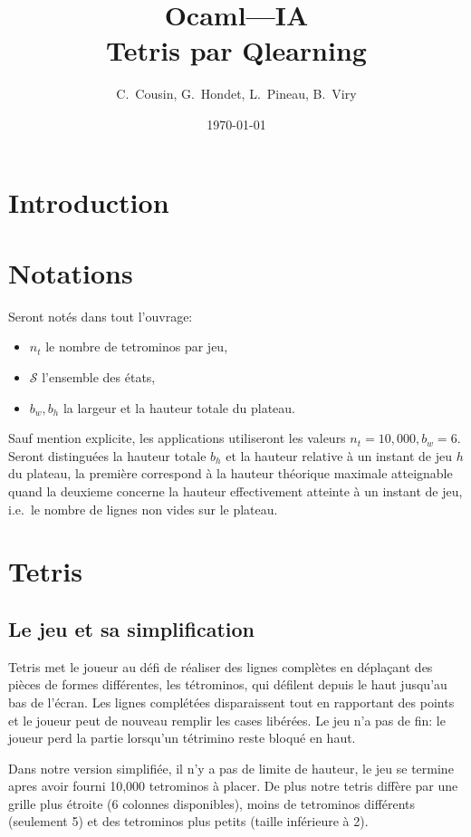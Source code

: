 \documentclass{article}
\title{Ocaml---IA\\Tetris par Qlearning}
\author{C.~Cousin, G.~Hondet, L.~Pineau, B.~Viry}
\date{\today}
\begin{document}
\maketitle
\tableofcontents

\section*{Introduction}

\section*{Notations}
Seront not\'es dans tout l'ouvrage:
\begin{itemize}
  \item \(n_t\) le nombre de tetrominos par jeu,
  \item \(\mathcal{S}\) l'ensemble des \'etats,
  \item \(b_w, b_h\) la largeur et la hauteur totale du plateau.
\end{itemize}
Sauf mention explicite, les applications utiliseront les valeurs \(n_t=10,000,
b_w = 6\). Seront distingu\'ees la hauteur totale \(b_h\) et la hauteur relative
à un instant de jeu \(h\) du plateau, la première correspond à la hauteur
théorique maximale atteignable quand la deuxieme concerne la hauteur
effectivement atteinte à un instant de jeu, i.e.\ le nombre de lignes non vides
sur le plateau.

\section{Tetris}

\subsection{Le jeu et sa simplification}
Tetris met le joueur au défi de réaliser des lignes complètes en déplaçant des
pièces de formes différentes, les tétrominos, qui défilent depuis le haut
jusqu'au bas de l'écran. Les lignes complétées disparaissent tout en rapportant
des points et le joueur peut de nouveau remplir les cases libérées. Le jeu
n'a pas de fin: le joueur perd la partie lorsqu'un tétrimino reste bloqué en
haut.

Dans notre version simplifiée, il n'y a pas de limite de hauteur, le jeu se
termine apres avoir fourni 10,000 tetrominos à placer. De plus notre
tetris diffère par une grille plus étroite (6 colonnes disponibles), moins de
tetrominos différents (seulement 5) et des tetrominos plus petits (taille
inférieure à 2).
\end{document}
